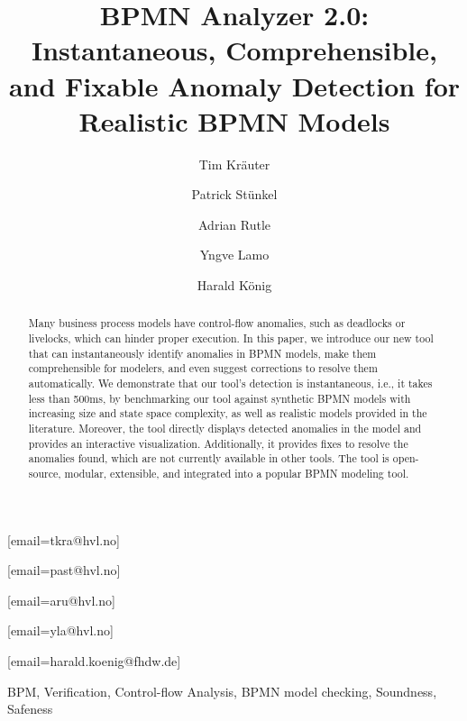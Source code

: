 \documentclass[
twocolumn,
]{ceurart}
\begin{document}


\title{BPMN Analyzer 2.0: Instantaneous, Comprehensible, and Fixable Anomaly Detection for Realistic BPMN Models}

\author[1]{Tim Kräuter}
[email=tkra@hvl.no]
\author[1]{Patrick Stünkel}
[email=past@hvl.no] %
\author[1]{Adrian Rutle}
[email=aru@hvl.no]
\author[1]{Yngve Lamo}
[email=yla@hvl.no]
\author[2,1]{Harald König}
[email=harald.koenig@fhdw.de]
\address[1]{Western Norway University of Applied Sciences, Bergen, Norway}
\address[2]{FHDW Hannover, Germany}

\begin{abstract}
Many business process models have control-flow anomalies, such as deadlocks or livelocks, which can hinder proper execution.
In this paper, we introduce our new tool that can instantaneously identify anomalies in BPMN models, make them comprehensible for modelers, and even suggest corrections to resolve them automatically.
We demonstrate that our tool's detection is instantaneous, i.e., it takes less than 500ms, by benchmarking our tool against synthetic BPMN models with increasing size and state space complexity, as well as realistic models provided in the literature.
Moreover, the tool directly displays detected anomalies in the model and provides an interactive visualization.
Additionally, it provides fixes to resolve the anomalies found, which are not currently available in other tools.
The tool is open-source, modular, extensible, and integrated into a popular BPMN modeling tool.
\end{abstract}

\begin{keywords}
BPM,
Verification,
Control-flow Analysis,
BPMN model checking,
Soundness,
Safeness
\end{keywords}

\maketitle

\end{document}

